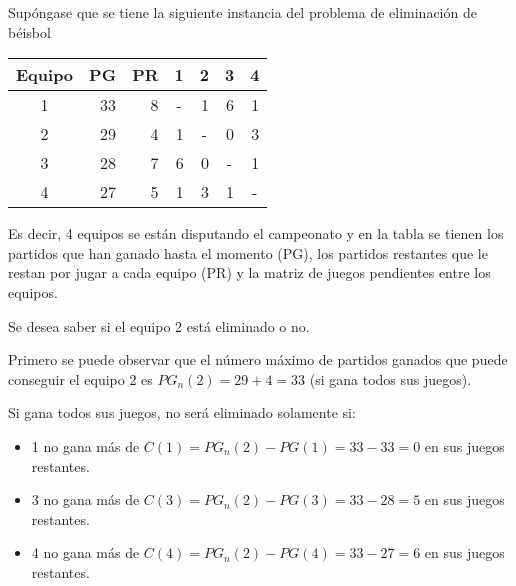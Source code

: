 \documentclass[12pt]{article}
\begin{document}
Supóngase que se tiene la siguiente instancia del problema de eliminación de béisbol \\

\begin{table}[H]
\centering
\begin{tabular}{|c|r|r|r|r|r|r|}
\hline
Equipo & \multicolumn{1}{c|}{PG} & \multicolumn{1}{c|}{PR} & \multicolumn{1}{c|}{1} & \multicolumn{1}{c|}{2} & \multicolumn{1}{c|}{3} & \multicolumn{1}{c|}{4} \\ \hline
1      & 33                       & 8                        & \multicolumn{1}{c|}{-} & 1                      & 6                      & 1                      \\ \hline
2      & 29                       & 4                        & 1                      & \multicolumn{1}{c|}{-} & 0                      & 3                      \\ \hline
3      & 28                       & 7                        & 6                      & 0                      & \multicolumn{1}{c|}{-} & 1                      \\ \hline
4      & 27                       & 5                        & 1                      & 3                      & 1                      & \multicolumn{1}{c|}{-} \\ \hline
\end{tabular}
\end{table}

Es decir, 4 equipos se están disputando el campeonato y en la tabla se tienen los partidos que han ganado hasta el momento (PG), los partidos restantes que le restan por jugar a cada equipo (PR) y la matriz de juegos pendientes entre los equipos. 

Se desea saber si el equipo 2 está eliminado o no.

Primero se puede observar que el número máximo de partidos ganados que puede conseguir el equipo 2 es  $PG_n(2) = 29 + 4 = 33$ (si gana todos sus juegos).

Si gana todos sus juegos, no será eliminado solamente si:

\begin{itemize}

\item 1 no gana más de  $C(1) = PG_n(2) - PG(1) = 33 - 33 = 0$ en sus juegos restantes.

\item 3 no gana más de  $C(3) = PG_n(2) - PG(3) = 33 - 28 = 5$ en sus juegos restantes.

\item 4 no gana más de  $C(4) = PG_n(2) - PG(4) = 33 - 27 = 6$ en sus juegos restantes.

\end{itemize}
\end{document}
